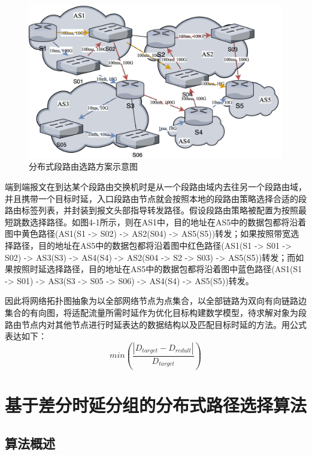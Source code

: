 \begin{figure}[htbp]
\setlength{\abovecaptionskip}{15pt plus 3pt minus 2pt}
\centerline{\includegraphics[width=1\textwidth]{./figures/ch4-problem-model.png}}
\caption{分布式段路由选路方案示意图}
\label{fig-ch4-problem-model}
\end{figure}    

端到端报文在到达某个段路由交换机时是从一个段路由域内去往另一个段路由域，并且携带一个目标时延，入口段路由节点就会按照本地的段路由策略选择合适的段路由标签列表，并封装到报文头部指导转发路径。假设段路由策略被配置为按照最短跳数选择路径。如图4-1所示，则在AS1中，目的地址在AS5中的数据包都将沿着图中黄色路径(AS1(S1 -> S02) -> AS2(S04) -> AS5(S5))转发；如果按照带宽选择路径，目的地址在AS5中的数据包都将沿着图中红色路径(AS1(S1 -> S01 -> S02) -> AS3(S3) -> AS4(S4) -> AS2(S04 -> S2 -> S03) -> AS5(S5))转发；而如果按照时延选择路径，目的地址在AS5中的数据包都将沿着图中蓝色路径(AS1(S1 -> S01) -> AS3(S3 -> S05 -> S06) -> AS4(S4) -> AS5(S5))转发。

因此将网络拓扑图抽象为以全部网络节点为点集合，以全部链路为双向有向链路边集合的有向图，将适配流量所需时延作为优化目标构建数学模型，待求解对象为段路由节点内对其他节点进行时延表达的数据结构以及匹配目标时延的方法。用公式表达如下：
$$min(\frac{|D_{target}-D_{redult}|}{D_{target}})$$

\section{基于差分时延分组的分布式路径选择算法}

\subsection{算法概述}

